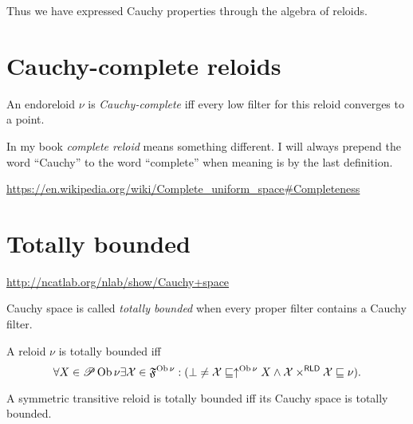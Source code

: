 Thus we have expressed Cauchy properties through the algebra of reloids.

\section{Cauchy-complete reloids}

\begin{defn}
  An endoreloid $\nu$ is \emph{Cauchy-complete} iff every low filter for
  this reloid converges to a point.
\end{defn}

\begin{rem}
  In my book \cite{volume-1} \emph{complete reloid} means something
  different. I will always prepend the word ``Cauchy'' to the word
  ``complete'' when meaning is by the last definition.
\end{rem}

\url{https://en.wikipedia.org/wiki/Complete\_uniform\_space\#Completeness}

\section{Totally bounded}

\url{http://ncatlab.org/nlab/show/Cauchy+space}

\begin{defn}
  Cauchy space is called \emph{totally bounded} when every proper filter
  contains a Cauchy filter. 
\end{defn}

\begin{obvious}
A reloid $\nu$ is totally bounded iff
\[ \forall X \in \mathscr{P} \operatorname{Ob} \nu \exists \mathcal{X} \in
   \mathfrak{F}^{\operatorname{Ob} \nu} : (\bot \neq \mathcal{X} \sqsubseteq
   \uparrow^{\operatorname{Ob} \nu} X \wedge \mathcal{X} \times^{\mathsf{RLD}}
   \mathcal{X} \sqsubseteq \nu) . \]
\end{obvious}

\begin{thm}
  A symmetric transitive reloid is totally bounded iff its Cauchy space is
  totally bounded.
\end{thm}


